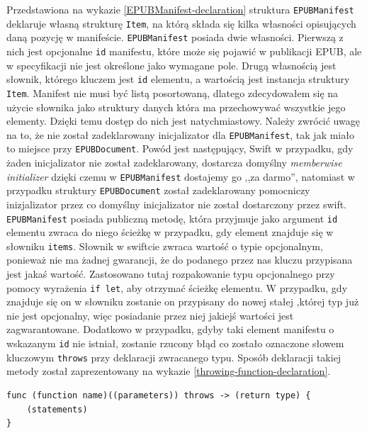 Przedstawiona na wykazie \ref{EPUBManifest-declaration} struktura \texttt{EPUBManifest} deklaruje własną strukturę \texttt{Item}, na którą składa się kilka własności opisujących daną pozycję w manifeście. \texttt{EPUBManifest} posiada dwie własności. Pierwszą z nich jest opcjonalne \texttt{id} manifestu, które może się pojawić w publikacji EPUB, ale w specyfikacji nie jest określone jako wymagane pole. Drugą własnością jest słownik, którego kluczem jest \texttt{id} elementu, a wartością jest instancja struktury \texttt{Item}. Manifest nie musi być listą posortowaną, dlatego zdecydowałem się na użycie słownika jako struktury danych która ma przechowywać wszystkie jego elementy. Dzięki temu dostęp do nich jest natychmiastowy. Należy zwrócić uwagę na to, że nie został zadeklarowany inicjalizator dla \texttt{EPUBManifest}, tak jak miało to miejsce przy \texttt{EPUBDocument}. Powód jest następujący, Swift w przypadku, gdy żaden inicjalizator nie został zadeklarowany, dostarcza domyślny \textit{memberwise initializer} dzięki czemu w \texttt{EPUBManifest} dostajemy go ,,za darmo'', natomiast w przypadku struktury \texttt{EPUBDocument} został zadeklarowany pomocniczy inizjalizator przez co domyślny inicjalizator nie został dostarczony przez swift. \texttt{EPUBManifest} posiada publiczną metodę, która przyjmuje jako argument \texttt{id} elementu zwraca do niego ścieżkę w przypadku, gdy element znajduje się w słowniku \texttt{items}. Słownik w swiftcie zwraca wartość o typie opcjonalnym, ponieważ nie ma żadnej gwarancji, że do podanego przez nas kluczu przypisana jest jakaś wartość. Zastosowano tutaj rozpakowanie typu opcjonalnego przy pomocy wyrażenia \texttt{if let}, aby otrzymać ścieżkę elementu. W przypadku, gdy znajduje się on w słowniku zostanie on przypisany do nowej stałej ,której typ już nie jest opcjonalny, więc posiadanie przez niej jakiejś wartości jest zagwarantowane. Dodatkowo w przypadku, gdyby taki element manifestu o wskazanym \texttt{id} nie istniał, zostanie rzucony błąd co zostało oznaczone słowem kluczowym \texttt{throws} przy deklaracji zwracanego typu. Sposób deklaracji takiej metody został zaprezentowany na wykazie \ref{throwing-function-declaration}.

\begin{lstlisting}[caption={Funkcje i metody które mogą rzucać błędy, przy deklaracji muszą zostać oznaczone słowem kluczowym \texttt{throws}\cite{theSwiftProgrammingLanguageDeclarations}},language=swift-reference,label=throwing-function-declaration]
func (function name)((parameters)) throws -> (return type) {
    (statements)
}
\end{lstlisting}

